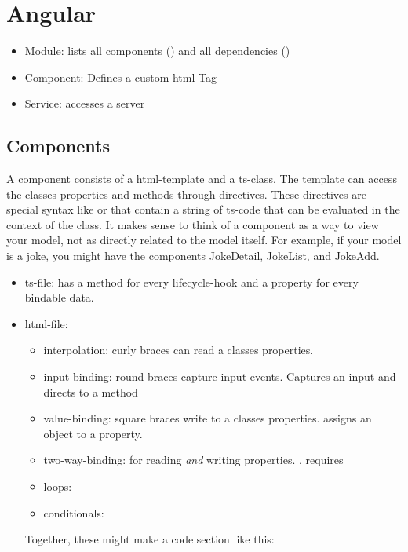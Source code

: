 \section{Angular}

\begin{itemize}
    \item Module: lists all components () and all dependencies ()
    \item Component: Defines a custom html-Tag
    \item Service: accesses a server
\end{itemize}

\subsection{Components}

A component consists of a html-template and a ts-class. The template can access the classes properties and methods through directives.
These directives are special syntax like \inlinecode{\{\}} or  that contain a string of ts-code that can be evaluated in the context of the class.
It makes sense to think of a component as a way to view your model, not as directly related to the model itself. For example, if your model is a joke, you might have the components JokeDetail, JokeList, and JokeAdd.

\begin{itemize}
    \item ts-file: has a method for every lifecycle-hook and a property for every bindable data.
    \item html-file:
            \begin{itemize}
                \item interpolation: curly braces can read a classes properties. 
                \item input-binding: round braces capture input-events.  Captures an input and directs to a method
                \item value-binding: square braces write to a classes properties.  assigns an object to a property. 
                \item two-way-binding: for reading \emph{and} writing properties. , requires 
                \item loops: 
                \item conditionals: 
            \end{itemize}
            Together, these might make a code section like this: 
\end{itemize}

